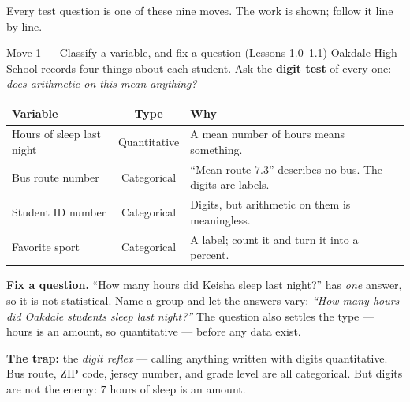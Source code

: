 \documentclass[10pt]{article}
\begin{document}
\small
Every test question is one of these nine moves. The work is shown; follow it line by line.

\vspace{4pt}
\boxguard[14]
\begin{notesbox}{Move 1 --- Classify a variable, and fix a question (Lessons 1.0--1.1)}
\small
Oakdale High School records four things about each student. Ask the \textbf{digit test} of
every one: \emph{does arithmetic on this mean anything?}

\vspace{2pt}
\renewcommand{\arraystretch}{1.2}
\begin{tabularx}{\linewidth}{@{} X c X @{}}
\rowcolor{frost}
\textbf{Variable} & \textbf{Type} & \textbf{Why} \\
\midrule
Hours of sleep last night & Quantitative & A mean number of hours means something. \\
Bus route number & Categorical & ``Mean route $7.3$'' describes no bus. The digits are
  labels. \\
Student ID number & Categorical & Digits, but arithmetic on them is meaningless. \\
Favorite sport & Categorical & A label; count it and turn it into a percent. \\
\end{tabularx}

\vspace{3pt}
\textbf{Fix a question.} ``How many hours did Keisha sleep last night?'' has \emph{one}
answer, so it is not statistical. Name a group and let the answers vary: \emph{``How many
hours did Oakdale students sleep last night?''} The question also settles the type ---
hours is an amount, so quantitative --- before any data exist.

\vspace{3pt}
\textbf{The trap:} the \emph{digit reflex} --- calling anything written with digits
quantitative. Bus route, ZIP code, jersey number, and grade level are all categorical. But
digits are not the enemy: $7$ hours of sleep is an amount.
\end{notesbox}
\end{document}
